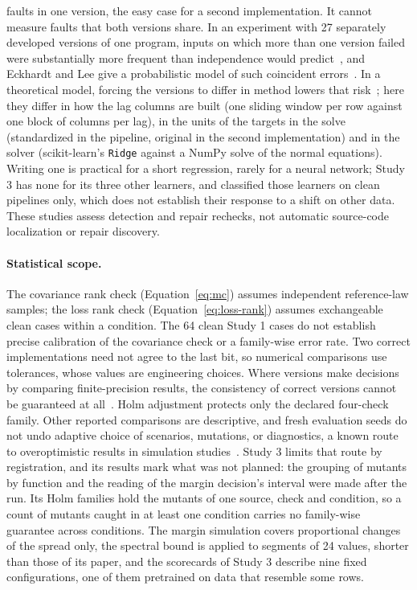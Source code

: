 \documentclass[11pt,a4paper]{article}
\newcommand{\code}[1]{\texttt{#1}}
\begin{document}
faults in one version, the easy case for a second implementation. It
cannot measure faults that both versions share. In an experiment with 27
separately developed versions of one program, inputs on which more than
one version failed were substantially more frequent than independence
would predict~\cite{knight1986experimental,brilliant1990analysis}, and
Eckhardt and Lee give a probabilistic model of such coincident
errors~\cite{eckhardt1985theoretical}. In a theoretical model, forcing the
versions to differ in method lowers that
risk~\cite{littlewood1989conceptual}; here they differ in how the lag
columns are built (one sliding window per row against one block of
columns per lag), in the units of the targets in the solve (standardized
in the pipeline, original in the second implementation) and in the
solver (scikit-learn's \code{Ridge} against a NumPy solve of the normal
equations). Writing one is
practical for a short regression, rarely for a neural network; Study 3
has none for its three other learners, and classified those learners on
clean pipelines only, which does not establish their response to a shift
on other data. These studies assess detection and
repair rechecks, not automatic source-code localization or repair
discovery.

\paragraph{Statistical scope.}
The covariance rank check (Equation~\eqref{eq:mc}) assumes independent
reference-law samples; the loss rank check (Equation~\eqref{eq:loss-rank})
assumes exchangeable clean cases within a condition. The 64 clean Study 1
cases do not establish precise calibration of the covariance check or a
family-wise error rate. Two correct implementations need not agree to the last bit, so numerical
comparisons use tolerances, whose values are engineering choices. Where
versions make decisions by comparing finite-precision results, the
consistency of correct versions cannot be guaranteed at
all~\cite{brilliant1989consistent}. Holm adjustment
protects only the declared four-check family. Other reported comparisons
are descriptive, and fresh evaluation seeds do not undo adaptive choice
of scenarios, mutations, or diagnostics, a known route to overoptimistic
results in simulation studies~\cite{pawel2024pitfalls}. Study 3 limits
that route by registration, and its results mark what was not planned: the
grouping of mutants by function and the reading of the margin decision's
interval were made after the run. Its Holm families hold the mutants of
one source, check and condition, so a count of mutants caught in at least
one condition carries no family-wise guarantee across conditions. The
margin simulation covers proportional changes of the spread only, the
spectral bound is applied to segments of 24 values, shorter than those of
its paper, and the scorecards of Study 3 describe nine fixed
configurations, one of them pretrained on data that resemble some rows.
\end{document}
